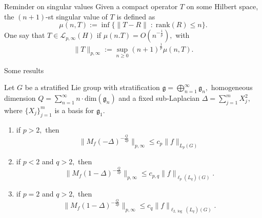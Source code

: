 \documentclass{beamer}
\numberwithin{equation}{section}
\theoremstyle{plain}
\theoremstyle{plain}
\theoremstyle{definition}
\theoremstyle{plain}
\theoremstyle{plain}
\theoremstyle{definition}
\newcommand{\Lc}{\mathcal{L}}
\newcommand{\gf}{\mathfrak{g}}
\begin{document}
\begin{frame}{Reminder on singular values}
Given a compact operator $T$ on some Hilbert space, the $(n+1)$-st singular value of $T$ is defined as
\[
  \mu(n,T) :=\inf\{\|T-R\|\;:\;\mathrm{rank}(R)\leq n\}.
\]
One say that $T \in \Lc_{p,\infty}(H)$ if $\mu(n.T) = O(n^{-\frac1p}),$ with
\[
  \|T\|_{p,\infty} := \sup_{n\geq 0} (n+1)^{\frac1p}\mu(n,T).
\]
\end{frame}

\begin{frame}{Some results}
\begin{theorem}\label{main_nontrivial_cwikel_theorem}
Let $G$ be a stratified Lie group with stratification $\gf = \bigoplus_{n=1}^\infty \gf_n,$ homogeneous dimension $Q = \sum_{n=1}^\infty n\cdot \mathrm{dim}(\gf_n)$
and a fixed sub-Laplacian $\Delta = \sum_{j=1}^m X_j^2,$ where $\{X_j\}_{j=1}^m$ is a basis for $\gf_1.$
\begin{enumerate}[{\rm (i)}]
\item\label{mncta} if $p>2,$ then
$$\|M_f(-\Delta)^{-\frac{Q}{2p}}\|_{p,\infty}\leq c_p\|f\|_{L_p(G)}$$
\item\label{mnctb} if $p<2$ and $q>2,$ then
$$\|M_f(1-\Delta)^{-\frac{Q}{2p}}\|_{p,\infty}\leq c_{p,q}\|f\|_{\ell_p(L_q)(G)}.$$
\item\label{mnctc} if $p=2$ and $q>2,$ then
$$\|M_f(1-\Delta)^{-\frac{Q}{2p}}\|_{p,\infty}\leq c_q\|f\|_{\ell_{2,\log}(L_q)(G)}.$$
\end{enumerate}
\end{theorem}
%
\end{frame}
\end{document}
